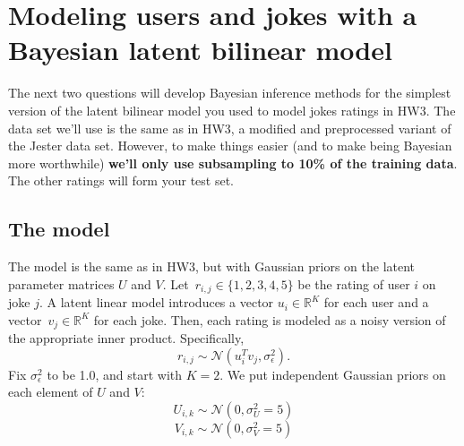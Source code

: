 \documentclass[submit]{harvardml}
\newcommand{\R}{\mathbb{R}}
\theoremstyle{plain}
\begin{document}
\newpage
\section*{Modeling users and jokes with a Bayesian latent bilinear model}

The next two questions will develop Bayesian inference methods for the simplest version of the latent bilinear model you used to model jokes ratings in HW3. The data set we'll use is the same as in HW3, a modified and preprocessed variant of the Jester data set. However, to make things easier (and to make being Bayesian more worthwhile) {\bf we'll only use subsampling to 10\% of the training data}.  The other ratings will form your test set.

\subsection*{The model}

The model is the same as in HW3, but with Gaussian priors on the latent parameter matrices $U$ and $V$. Let~${r_{i,j}\in\{1,2,3,4,5\}}$ be the rating of user $i$ on joke $j$.  A latent linear model introduces a vector ${u_i\in\R^K}$ for each user and a vector~${v_j\in\R^K}$ for each joke.  Then, each rating is modeled as a noisy version of the appropriate inner product. Specifically,
\[
r_{i,j} \sim \mathcal{N}(u_i^T v_j, \sigma_\epsilon^2).
\]
Fix $\sigma_\epsilon^2$ to be 1.0, and start with $K = 2$. We put independent Gaussian priors on each element of $U$ and $V$:
\[U_{i,k} \sim \mathcal{N}(0, \sigma_U^2=5)\]
\[V_{i,k} \sim \mathcal{N}(0, \sigma_V^2=5)\]
\end{document}
